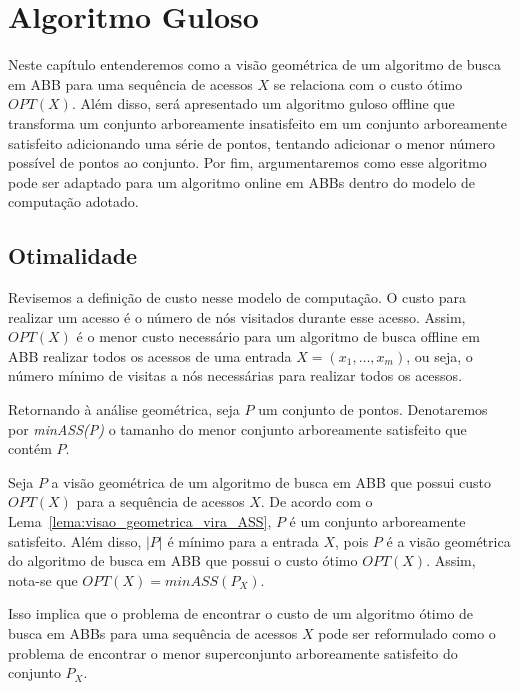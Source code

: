 
\chapter{Algoritmo Guloso}
\label{cap:algoritmo-guloso}


Neste capítulo entenderemos como a visão geométrica de um algoritmo de busca em ABB para uma sequência de acessos $X$ se relaciona com o custo ótimo $OPT(X)$. Além disso, será apresentado um algoritmo guloso offline que transforma um conjunto arboreamente insatisfeito em um conjunto arboreamente satisfeito adicionando uma série de pontos, tentando adicionar o menor número possível de pontos ao conjunto. Por fim, argumentaremos como esse algoritmo pode ser adaptado para um algoritmo online em ABBs dentro do modelo de computação adotado.

\section{Otimalidade} 

Revisemos a definição de custo nesse modelo de computação. O custo para realizar um acesso é o número de nós visitados durante esse acesso. Assim, $OPT(X)$ é o menor custo necessário para um algoritmo de busca offline em ABB realizar todos os acessos de uma entrada $X = (x_{1},\ldots,x_{m})$, ou seja, o número mínimo de visitas a nós necessárias para realizar todos os acessos.

Retornando à análise geométrica, seja $P$ um conjunto de pontos. Denotaremos por \textit{minASS(P)} o tamanho do menor conjunto arboreamente satisfeito que contém $P$. 

Seja $P$ a visão geométrica de um algoritmo de busca em ABB que possui custo $OPT(X)$ para a sequência de acessos $X$. De acordo com o Lema~\ref{lema:visao_geometrica_vira_ASS}, $P$ é um conjunto arboreamente satisfeito. Além disso, $|P|$ é mínimo para a entrada $X$, pois $P$ é a visão geométrica do algoritmo de busca em ABB que possui o custo ótimo $OPT(X)$. Assim, nota-se que $OPT(X) = minASS(P_X)$.

Isso implica que o problema de encontrar o custo de um algoritmo ótimo de busca em ABBs para uma sequência de acessos $X$ pode ser reformulado como o problema de encontrar o menor superconjunto arboreamente satisfeito do conjunto $P_X$.

